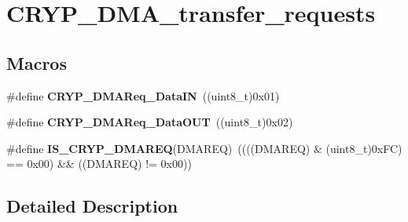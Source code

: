 \hypertarget{group___c_r_y_p___d_m_a__transfer__requests}{}\section{C\+R\+Y\+P\+\_\+\+D\+M\+A\+\_\+transfer\+\_\+requests}
\label{group___c_r_y_p___d_m_a__transfer__requests}
\subsection*{Macros}
\begin{DoxyCompactItemize}
\item 
\hypertarget{group___c_r_y_p___d_m_a__transfer__requests_gae524983ae7dc12d0f91e73bac4dda8e9}{}\#define {\bfseries C\+R\+Y\+P\+\_\+\+D\+M\+A\+Req\+\_\+\+Data\+I\+N}~((uint8\+\_\+t)0x01)\label{group___c_r_y_p___d_m_a__transfer__requests_gae524983ae7dc12d0f91e73bac4dda8e9}

\item 
\hypertarget{group___c_r_y_p___d_m_a__transfer__requests_ga35ef833d8049278f5381681892a35df0}{}\#define {\bfseries C\+R\+Y\+P\+\_\+\+D\+M\+A\+Req\+\_\+\+Data\+O\+U\+T}~((uint8\+\_\+t)0x02)\label{group___c_r_y_p___d_m_a__transfer__requests_ga35ef833d8049278f5381681892a35df0}

\item 
\hypertarget{group___c_r_y_p___d_m_a__transfer__requests_gaa382c78dd1657a151827830d946df578}{}\#define {\bfseries I\+S\+\_\+\+C\+R\+Y\+P\+\_\+\+D\+M\+A\+R\+E\+Q}(D\+M\+A\+R\+E\+Q)~((((D\+M\+A\+R\+E\+Q) \& (uint8\+\_\+t)0x\+F\+C) == 0x00) \&\& ((\+D\+M\+A\+R\+E\+Q) != 0x00))\label{group___c_r_y_p___d_m_a__transfer__requests_gaa382c78dd1657a151827830d946df578}

\end{DoxyCompactItemize}


\subsection{Detailed Description}
